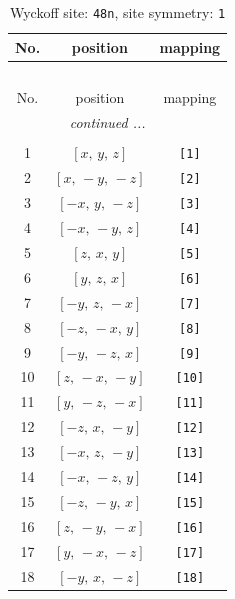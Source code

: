 \documentclass[fleqn,8pt]{jsarticle}
\begin{document}
\renewcommand{\arraystretch}{1.2}
\begin{longtable}{ccc}
\caption{Wyckoff site: {\tt 48n}, site symmetry: {\tt 1}}
 \\
 \hline \hline
No. & position & mapping \\ \hline \endfirsthead

\multicolumn{2}{l}{\tablename\ \thetable{}} \\
 \hline \hline
No. & position & mapping \\ \hline \endhead

 \hline \hline
\multicolumn{2}{r}{\footnotesize\it continued ...} \\ \endfoot

 \hline \hline
\multicolumn{2}{r}{} \\ \endlastfoot

1 & $\left[ x,\, y,\, z \right]$ & {\tt [1]} \\ \hline
2 & $\left[ x,\, - y,\, - z \right]$ & {\tt [2]} \\ \hline
3 & $\left[ - x,\, y,\, - z \right]$ & {\tt [3]} \\ \hline
4 & $\left[ - x,\, - y,\, z \right]$ & {\tt [4]} \\ \hline
5 & $\left[ z,\, x,\, y \right]$ & {\tt [5]} \\ \hline
6 & $\left[ y,\, z,\, x \right]$ & {\tt [6]} \\ \hline
7 & $\left[ - y,\, z,\, - x \right]$ & {\tt [7]} \\ \hline
8 & $\left[ - z,\, - x,\, y \right]$ & {\tt [8]} \\ \hline
9 & $\left[ - y,\, - z,\, x \right]$ & {\tt [9]} \\ \hline
10 & $\left[ z,\, - x,\, - y \right]$ & {\tt [10]} \\ \hline
11 & $\left[ y,\, - z,\, - x \right]$ & {\tt [11]} \\ \hline
12 & $\left[ - z,\, x,\, - y \right]$ & {\tt [12]} \\ \hline
13 & $\left[ - x,\, z,\, - y \right]$ & {\tt [13]} \\ \hline
14 & $\left[ - x,\, - z,\, y \right]$ & {\tt [14]} \\ \hline
15 & $\left[ - z,\, - y,\, x \right]$ & {\tt [15]} \\ \hline
16 & $\left[ z,\, - y,\, - x \right]$ & {\tt [16]} \\ \hline
17 & $\left[ y,\, - x,\, - z \right]$ & {\tt [17]} \\ \hline
18 & $\left[ - y,\, x,\, - z \right]$ & {\tt [18]} \\ \hline

\end{longtable}
\end{document}

